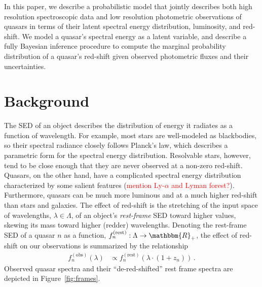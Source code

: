 \documentclass{article}
\newcommand{\R}{\mathbbm{R}}
\newcommand{\red}[1]{\textcolor{red}{#1}}
\begin{document}
In this paper, we describe a probabilistic model that jointly describes both high resolution spectroscopic data and low resolution photometric observations of quasars in terms of their latent spectral energy distribution, luminosity, and red-shift.  We model a quasar's spectral energy as a latent variable, and describe a fully Bayesian inference procedure to compute the marginal probability distribution of a quasar's red-shift given observed photometric fluxes and their uncertainties. 

\section{Background}
The SED of an object describes the distribution of energy it radiates as a function of wavelength.  
For example, most stars are well-modeled as blackbodies, so their spectral radiance closely follows Planck's law, which describes a parametric form for the spectral energy distribution.  Resolvable stars, however, tend to be close enough that they are never observed at a non-zero red-shift. 
Quasars, on the other hand, have a complicated spectral energy distribution characterized by some salient features (\red{mention Ly-$\alpha$ and Lyman forest?}).  
Furthermore, quasars can be much more luminous and at a much higher red-shift than stars and galaxies.  
The effect of red-shift is the stretching of the input space of wavelengths, $\lambda\in \Lambda$, of an object's \emph{rest-frame} SED toward higher values, skewing its mass toward higher (redder) wavelengths. 
Denoting the rest-frame SED of a quasar $n$ as a function, $f_n^{(\text{rest})} : \Lambda \rightarrow \R_+$, the effect of red-shift on our observations is summarized by the relationship 
\begin{align}
  f_n^{(\text{obs})}(\lambda) &\propto f_n^{(\text{rest})}(\lambda \cdot (1 + z_n)) \, .
\end{align}
Observed quasar spectra and their ``de-red-shifted'' rest frame spectra are depicted in Figure~\ref{fig:frames}.
\end{document}
